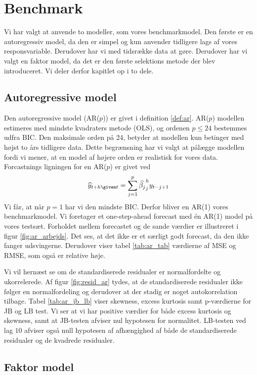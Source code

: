 \chapter{Benchmark}
Vi har valgt at anvende to modeller, som vores benchmarkmodel. Den første er en autoregressiv model, da den er simpel og kun anvender tidligere lags af vores responsvariable. Derudover har vi med tidsrække data at gøre. 
Derudover har vi valgt en faktor model, da det er den første selektions metode der blev introduceret. 
Vi deler derfor kapitlet op i to dele. 

\section{Autoregressive model}
Den autoregressive model (AR($p$)) er givet i definition \ref{def:ar}. 
AR($p$) modellen estimeres med mindste kvadraters metode (OLS), og ordenen $p \leq 24$ bestemmes udfra BIC. Den maksimale orden på 24, betyder at modellen kun betinger med højst to års tidligere data. Dette begrænsning har vi valgt at pålægge modellen fordi vi mener, at en model af højere orden er realistisk for vores data. 
Forcastnings ligningen for en AR($p$) er givet ved 
\begin{equation}
\widehat{y}_{t+h \given t} = \sum_{j = 1}^p \widehat{\beta_j}^h_j y_{t-j+1}
\end{equation}
Vi får, at når $p = 1$ har vi den mindste BIC. 
Derfor bliver en AR(1) vores benchmarkmodel. 
Vi foretager et one-step-ahead forecast med én AR(1) model på vores testsæt.
Forholdet mellem forecastet og de sande værdier er illustreret i figur \ref{fig:ar_arbejds}. 
Det ses, at det ikke er et særligt godt forecast, da den ikke fanger udsvingerne. 
Derudover viser tabel \ref{tab:ar_tab} værdierne af MSE og RMSE, som også er relative høje. 



 
Vi vil hernæst se om de standardiserede residualer er normalfordelte og ukorrelerede.
Af figur \ref{fig:resid_ar} tydes, at de standardiserede residualer ikke følger en normalfordeling og derudover at der stadig er noget autokorrelation tilbage. 
Tabel \ref{tab:ar_jb_lb} viser skewness, excess kurtosis samt p-værdierne for JB og LB test. 
Vi ser at vi har positive værdier for både excess kurtosis og skewness, samt at JB-testen afviser nul hypotesen for normalitet. 
LB-testen ved lag $10$ afviser også null hypotesen af afhængighed af både de standardiserede residualer og de kvadrede residualer. 



 
\section{Faktor model}
